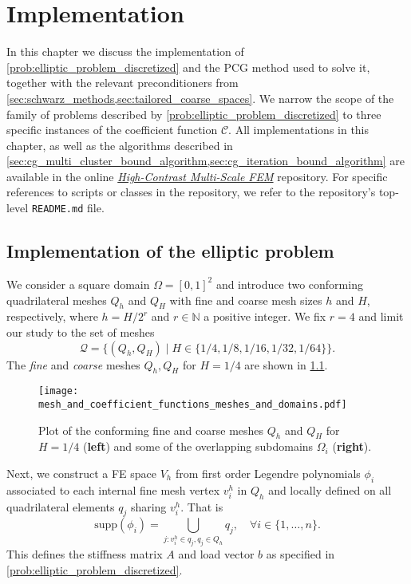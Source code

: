 \chapter{Implementation}\label{ch:implementation}
In this chapter we discuss the implementation of \cref{prob:elliptic_problem_discretized} and the PCG method used to solve it, together with the relevant preconditioners from \cref{sec:schwarz_methods,sec:tailored_coarse_spaces}. We narrow the scope of the family of problems described by \cref{prob:elliptic_problem_discretized} to three specific instances of the coefficient function $\mathcal{C}$. All implementations in this chapter, as well as the algorithms described in \cref{sec:cg_multi_cluster_bound_algorithm,sec:cg_iteration_bound_algorithm} are available in the online \href{https://github.com/PhilipSoliman/hcmsfem}{\textit{High-Contrast Multi-Scale FEM}} repository. For specific references to scripts or classes in the repository, we refer to the repository's top-level \texttt{README.md} file.

\section{Implementation of the elliptic problem}\label{sec:implementation_elliptic_problem}
We consider a square domain $\Omega = [0,1]^2$ and introduce two conforming quadrilateral meshes $Q_h$ and $Q_H$ with fine and coarse mesh sizes $h$ and $H$, respectively, where $h = H/2^r$ and $r\in\mathbb{N}$ a positive integer. We fix $r=4$ and limit our study to the set of meshes
\begin{equation}
    \mathcal{Q} = \{(Q_h, Q_H)\mid H\in\{1/4, 1/8, 1/16, 1/32, 1/64\}\}.
    \label{eq:meshes}
\end{equation}
The \textit{fine} and \textit{coarse} meshes $Q_h, Q_H$ for $H=1/4$ are shown in \cref{fig:mesh_4}.
\begin{figure}[H]
    \centering
    \texttt{[image: mesh\_and\_coefficient\_functions\_meshes\_and\_domains.pdf]}
    \caption{Plot of the conforming fine and coarse meshes $Q_h$ and $Q_H$ for $H=1/4$ (\textbf{left}) and some of the overlapping subdomains $\Omega_i$ (\textbf{right}).}
    \label{fig:mesh_4}
\end{figure}
Next, we construct a FE space $V_h$ from first order Legendre polynomials $\phi_i$ associated to each internal fine mesh vertex $v^h_i$ in $Q_h$ and locally defined on all quadrilateral elements $q_j$ sharing $v^h_i$. That is
\[
    \text{supp}(\phi_i) = \bigcup_{j: v^h_i\in q_j, q_j \in Q_h} q_j, \quad \forall i\in\{1,\ldots,n\}.
\]
This defines the stiffness matrix $A$ and load vector $b$ as specified in \cref{prob:elliptic_problem_discretized}.

